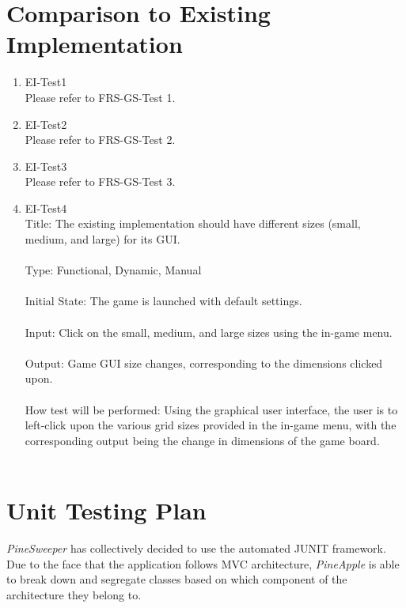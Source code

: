 \documentclass[12pt, titlepage]{article}
\begin{document}
\newpage
\section{Comparison to Existing Implementation}

\begin{enumerate}

\item{EI-Test1\\}
Please refer to FRS-GS-Test 1.\\

\item{EI-Test2\\}
Please refer to FRS-GS-Test 2.\\

\item{EI-Test3\\}
Please refer to FRS-GS-Test 3.\\

\item{EI-Test4\\}
Title: The existing implementation should have different sizes (small, medium, and large) for its GUI.\\\\
Type: Functional, Dynamic, Manual \\\\
Initial State: The game is launched with default settings.\\\\
Input: Click on the small, medium, and large sizes using the in-game menu.\\\\
Output: Game GUI size changes, corresponding to the dimensions clicked upon.\\\\
How test will be performed: Using the graphical user interface, the user is to left-click upon the various grid sizes provided in the in-game menu, with the corresponding output being the change in dimensions of the game board.\\\\

\end{enumerate}
\newpage				
\section{Unit Testing Plan}

\textit{PineSweeper} has collectively decided to use the automated JUNIT framework. Due to the face that the application follows MVC architecture, \textit{PineApple} is able to break down and segregate classes based on which component of the architecture they belong to.
		
\end{document}
